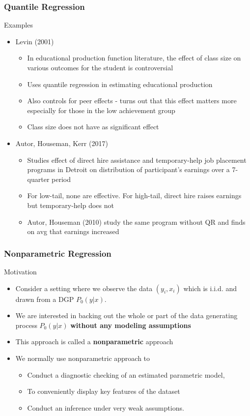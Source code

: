 \documentclass{beamer}
\begin{document}
\begin{frame}
\frametitle{Quantile Regression}
Examples
\begin{itemize}
\item Levin (2001)
\begin{itemize}
\item In educational production function literature, the effect of class size on various outcomes for the student is controversial 
\item Uses quantile regression in estimating educational production
\item Also controls for peer effects - turns out that this effect matters more especially for those in the low achievement group
\item Class size does not have as significant effect
\end{itemize}
\item Autor, Houseman, Kerr (2017)
\begin{itemize}
\item Studies effect of direct hire assistance and temporary-help job placement programs in Detroit on distribution of participant's earnings over a 7-quarter period
\item For low-tail, none are effective. For high-tail, direct hire raises earnings but temporary-help does not
\item Autor, Houseman (2010) study the same program without QR and finds on avg that earnings increased
\end{itemize}
\end{itemize}
\end{frame}


\begin{frame}
\frametitle{Nonparametric Regression}
Motivation
\begin{itemize}
\item Consider a setting where we observe the data $(y_i,x_i)$ which is i.i.d. and drawn from a DGP $P_0(y|x)$.
\item We are interested in backing out the whole or part of the data generating process $P_0(y|x)$ \textbf{without any modeling assumptions}
\item This approach is called a \textbf{nonparametric} approach
\item We normally use nonparametric approach to 
\begin{itemize}
\item Conduct a diagnostic checking of an estimated parametric model, 
\item To conveniently display key features of the dataset 
\item Conduct an inference under very weak assumptions.
\end{itemize}
\end{itemize}
\end{frame}
\end{document}
